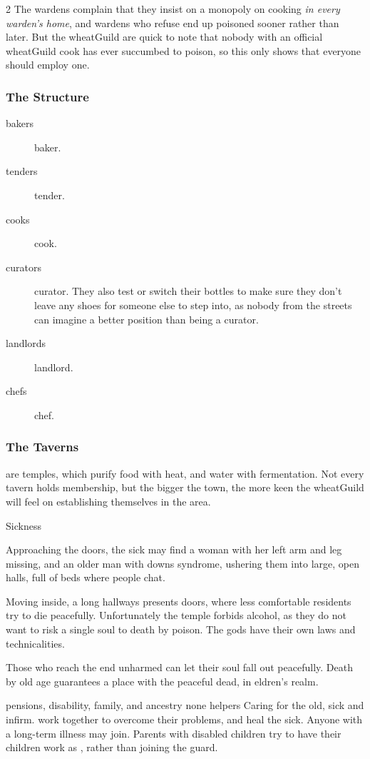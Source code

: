 \begin{multicols}{2}
The \glspl{warden} complain that they insist on a monopoly on cooking \emph{in every \gls{warden}'s home}, and \glspl{warden} who refuse end up poisoned sooner rather than later.
But the \gls{wheatGuild} are quick to note that nobody with an official \gls{wheatGuild} cook has ever succumbed to poison, so this only shows that everyone should employ one.


\subsubsection{The Structure}

\begin{description}
  \item[\Glspl{baker}]
  \glsdesc{baker}.
  \item[\Glspl{tender}]
  \glsdesc{tender}.
  \item[\Glspl{cook}]
  \glsdesc{cook}.
  \item[\Glspl{curator}]
  \glsdesc{curator}.
  They also test or switch their bottles to make sure they don't leave any shoes for someone else to step into, as nobody from the streets can imagine a better position than being a curator.
  \item[\Glspl{landlord}]
  \glsdesc{landlord}.
  \item[\Glspl{chef}]
  \glsdesc{chef}.
\end{description}

\null
\subsubsection{The Taverns}
are temples, which purify food with heat, and water with fermentation.
Not every tavern holds membership, but the bigger the town, the more keen the \gls{wheatGuild} will feel on establishing themselves in the area.

  {Sickness}%
  {
    Approaching the doors, the sick may find a woman with her left arm and leg missing, and an older man with downs syndrome, ushering them into large, open halls, full of beds where people chat.

    Moving inside, a long hallways presents doors, where less comfortable residents try to die peacefully.
    Unfortunately the temple forbids alcohol, as they do not want to risk a single soul to death by poison.
    The gods have their own laws and technicalities.

    Those who reach the end unharmed can let their soul fall out peacefully.
    Death by old age guarantees a place with the peaceful dead, in \gls{eldren}'s realm.
  }%
  {pensions, disability, family, and ancestry}%
  {none}%
  {\Glspl{helper}}%
  {
    Caring for the old, sick and infirm.
  }%
work together to overcome their problems, and heal the sick.
Anyone with a long-term illness may join.
Parents with disabled children try to have their children work as , rather than joining the \gls{guard}.


\end{multicols}
